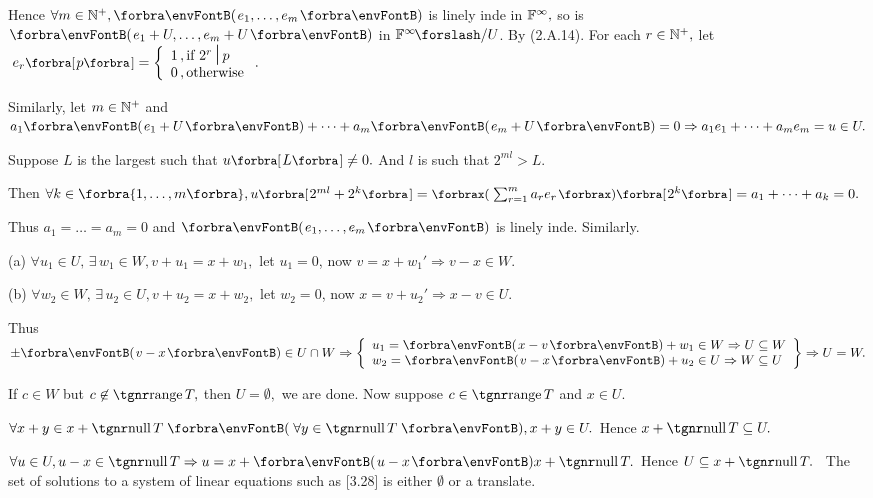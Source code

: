 Hence $\forall m\in\Nbp,\Par{e_1,\dots,e_m}$ is linely inde in ${\mathbb{F}}^{\infty},$ so is $\Par{e_1+U,\dots,e_m+U}$ in $\Fbb^{\infty}\XSlash U$. By (2.A.14).\PfEnd\vspace{14pt}\quad
\Or For each $r\in{\mathbb{N}^+},$ let $\;e_r\Sbra{p}=\hMath[0pt]{l}{\left\{}{\right.}{1\,,\text{if }2^r\,\mmid\,p\\0\,,\text{otherwise}}.$\vspace{4pt}\par\quad
Similarly, let $m\in{\mathbb{N}^+}$ and $a_1\Par{e_1+U}+\dots+a_m\Par{e_m+U}=0\Rightarrow a_1e_1+\dots+a_me_m=u\in U.$\vspace{4pt}\par\quad
Suppose $L$ is the largest such that $u\Sbra{L}\neq 0.$ And $l$ is such that $2^{ml}> L.$\vspace{6pt}\par\quad
Then $\forall k\in\Bra{1,\dots,m},u\Sbra{2^{ml}+2^k}=\XPar{\sum_{r=1}^m a_re_r}\Sbra{2^k}=a_1+\dots+a_k=0.$\vspace{6pt}\par\quad
Thus $a_1=\dots=a_m=0$ and $\Par{e_1,\dots,e_m}$ is linely inde. Similarly.\PfEnd
\SepLine

\par\quad
(a) $\forall u_1\in U,\,\exists\,w_1\in W,v+u_1=x+w_1,$ let $u_1=0$, now $v=x+w_1'\Rightarrow v-x\in W$.\par\quad
(b) $\forall w_2\in W,\,\exists\,u_2\in U,v+u_2=x+w_2,$ let $w_2=0$, now $x=v+u_2'\Rightarrow x-v\in U$.\par\quad
Thus $\pm\Par{v-x}\in U\cap W \Rightarrow\MathLeftrightBrace{l}{u_1=\Par{x-v}+w_1\in W\Rightarrow U\subseteq W\\w_2=\Par{v-x}+u_2\in U\Rightarrow W\subseteq U}\Rightarrow U=W.$\PfEnd
\SepLine

\SepLine

\par\quad
If $c\in W$ but $c\not\in\range T,$ then $U=\emptyset,$ we are done. Now suppose $c\in\range T$ and $x\in U.$\vspace{0pt}\par\quad
$\forall x+y\in x+\null T\;\Par{\,\forall y\in\null T\,},x+y\in U.$ Hence $x+\null T\subseteq U.$\vspace{0pt}\par\quad
$\forall u\in U,u-x\in\null T\Rightarrow u=x+\Par{u-x} x+\null T.$ Hence $U\subseteq x+\null T.$\PfEnd
\Corollary \,\,\,{\tgsl The set of solutions to a system of linear equations such as [3.28] is either $\emptyset$ or a translate.}\par
\SepLine

